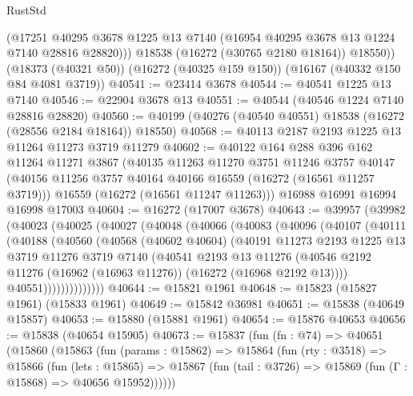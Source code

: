 \begin{lexlean}{RustStd}
\begin{coremodule}
          (@17251 @40295 @3678 @1225 @13 @7140 (@16954 @40295 @3678 @13 @1224 @7140 @28816 @28820)))
        @18538
        (@16272 (@30765 @2180 @18164))
        @18550))
    (@18373 (@40321 @50))
    (@16272 (@40325 @159 @150))
    (@16167 (@40332 @150 @84 @4081 @3719))
@40541 := @23414 @3678
@40544 := @40541 @1225 @13 @7140
@40546 := @22904 @3678 @13
@40551 := @40544 (@40546 @1224 @7140 @28816 @28820)
@40560 := @40199 (@40276 (@40540 @40551) @18538 (@16272 (@28556 @2184 @18164)) @18550)
@40568 := @40113 @2187 @2193 @1225 @13 @11264 @11273 @3719 @11279
@40602 := @40122
    @164
    @288
    @396
    @162
    @11264
    @11271
    @3867
    (@40135
      @11263
      @11270
      @3751
      @11246
      @3757
      @40147
      (@40156 @11256 @3757 @40164 @40166 @16559 (@16272 (@16561 @11257 @3719)))
      @16559
      (@16272 (@16561 @11247 @11263)))
    @16988
    @16991
    @16994
    @16998
    @17003
@40604 := @16272 (@17007 @3678)
@40643 := @39957
    (@39982
      (@40023
        (@40025
          (@40027
            (@40048
              (@40066
                (@40083
                  (@40096
                    (@40107
                      (@40111
                        (@40188
                          (@40560
                            (@40568
                              (@40602 @40604)
                              (@40191
                                @11273
                                @2193
                                @1225
                                @13
                                @3719
                                @11276
                                @3719
                                @7140
                                (@40541
                                  @2193
                                  @13
                                  @11276
                                  (@40546
                                    @2192
                                    @11276
                                    (@16962 (@16963 @11276))
                                    (@16272 (@16968 @2192 @13))))
                                @40551))))))))))))))
@40644 := @15821 @1961
@40648 := @15823 (@15827 @1961) (@15833 @1961)
@40649 := @15842 @36981
@40651 := @15838 (@40649 @15857)
@40653 := @15880 (@15881 @1961)
@40654 := @15876 @40653
@40656 := @15838 (@40654 @15905)
@40673 := @15837
    (fun (fn : @74) =>
    @40651
      (@15860
        (@15863
          (fun (params : @15862) =>
          @15864
            (fun (rty : @3518) =>
            @15866
              (fun (lets : @15865) =>
              @15867 (fun (tail : @3726) => @15869 (fun (Γ : @15868) => @40656 @15952))))))

\end{coremodule}
\end{lexlean}
